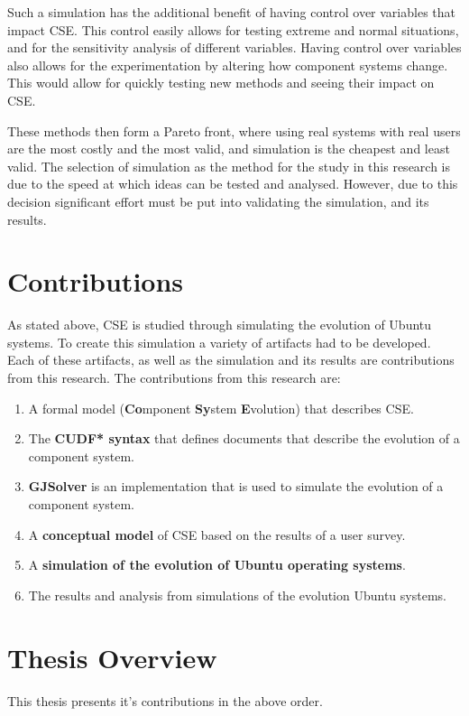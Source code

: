 Such a simulation has the additional benefit of having control over variables that impact CSE.
This control easily allows for testing extreme and normal situations,
and for the sensitivity analysis of different variables.
Having control over variables also allows for the experimentation by altering how component systems change.
This would allow for quickly testing new methods and seeing their impact on CSE.

These methods then form a Pareto front, where using real systems with real users are the most costly and the most valid, 
and simulation is the cheapest and least valid.
The selection of simulation as the method for the study in this research is due to the speed at which ideas can be tested and analysed.
However, due to this decision significant effort must be put into validating the simulation, and its results. 

\section{Contributions}
As stated above, CSE is studied through simulating the evolution of Ubuntu systems.
To create this simulation a variety of artifacts had to be developed.
Each of these artifacts, as well as the simulation and its results are contributions from this research. 
The contributions from this research are:
\begin{enumerate}
  \item A formal model \textbf{\modelname} (\textbf{Co}mponent \textbf{Sy}stem \textbf{E}volution) that describes CSE. 
  \item The \textbf{CUDF* syntax} that defines documents that describe the evolution of a component system.
  \item \textbf{GJSolver} is an implementation that is used to simulate the evolution of a component system.
  \item A \textbf{conceptual model} of CSE based on the results of a user survey. 
  \item A \textbf{simulation of the evolution of Ubuntu operating systems}.
  \item The results and analysis from simulations of the evolution Ubuntu systems.
\end{enumerate}

\section{Thesis Overview}
This thesis presents it's contributions in the above order.

